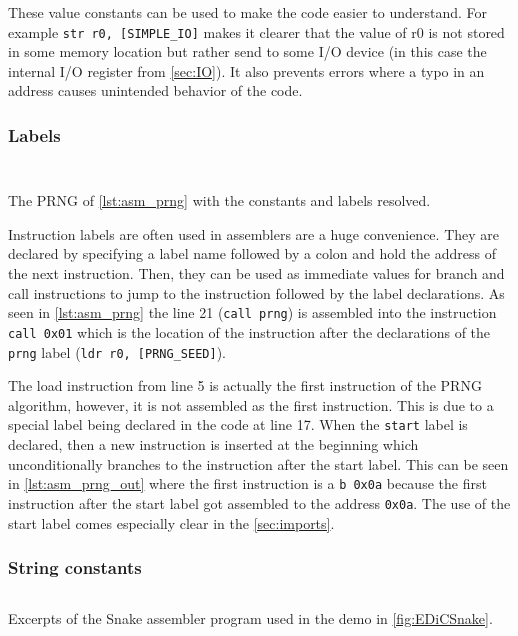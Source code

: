 These value constants can be used to make the code easier to understand.
For example \texttt{str r0, [SIMPLE_IO]} makes it clearer that the value of r0 is not stored in some memory location but rather send to some I/O device (in this case the internal I/O register from \cref{sec:IO}).
It also prevents errors where a typo in an address causes unintended behavior of the code.

\subsubsection{Labels}
\begin{listing}
  \begin{multicols}{2}
    \inputminted[linenos,
      breaklines,
      frame=leftline,
      xleftmargin=20pt,
    ]{ARM}{src/prng.s}
    \inputminted[breaklines]{ARM}{src/prng_cmp.s}

  \end{multicols}
  \caption{The \gls{PRNG} of \cref{lst:asm_prng} with the constants and labels resolved.}
  \label{lst:asm_prng_cmp}
\end{listing}
Instruction labels are often used in assemblers are a huge convenience.
They are declared by specifying a label name followed by a colon and hold the address of the next instruction.
Then, they can be used as immediate values for branch and call instructions to jump to the instruction followed by the label declarations.
As seen in \cref{lst:asm_prng} the line 21 (\texttt{call prng}) is assembled into the instruction \texttt{call 0x01} which is the location of the instruction after the declarations of the \texttt{prng} label (\texttt{ldr r0, [PRNG_SEED]}).

The load instruction from line 5 is actually the first instruction of the \gls{PRNG} algorithm, however, it is not assembled as the first instruction.
This is due to a special label being declared in the code at line 17.
When the \texttt{start} label is declared, then a new instruction is inserted at the beginning which unconditionally branches to the instruction after the start label.
This can be seen in \cref{lst:asm_prng_out} where the first instruction is a \texttt{b 0x0a} because the first instruction after the start label got assembled to the address \texttt{0x0a}.
The use of the start label comes especially clear in the \cref{sec:imports}.

\subsubsection{String constants}
\begin{listing}
  \inputminted[linenos,
    breaklines,
    frame=leftline,
    xleftmargin=20pt,
  ]{ARM}{src/snake_excerpt.s}
  \caption{Excerpts of the Snake assembler program used in the demo in \cref{fig:EDiCSnake}.}
  \label{lst:asm_snake_excerpt}
\end{listing}


